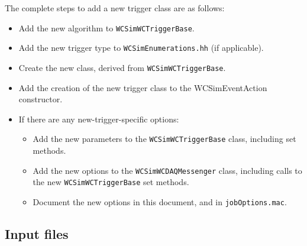 The complete steps to add a new trigger class are as follows:
\begin{itemize}
\item Add the new algorithm to \texttt{WCSimWCTriggerBase}.
\item Add the new trigger type to \texttt{WCSimEnumerations.hh} (if applicable).
\item Create the new class, derived from \texttt{WCSimWCTriggerBase}.
\item Add the creation of the new trigger class to the WCSimEventAction constructor.
\item If there are any new-trigger-specific options:
  \begin{itemize}
  \item Add the new parameters to the \texttt{WCSimWCTriggerBase} class, including set methods.
  \item Add the new options to the \texttt{WCSimWCDAQMessenger} class, including calls to the new \texttt{WCSimWCTriggerBase} set methods.
  \item Document the new options in this document, and in \texttt{jobOptions.mac}.
  \end{itemize}
\end{itemize}

\subsection{Input files}
\label{sec:daq:options}

